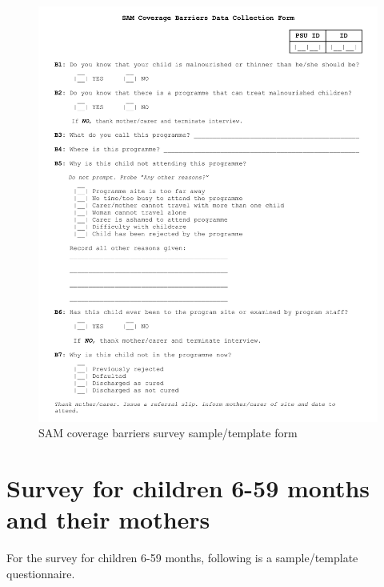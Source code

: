 \documentclass[12pt,a4paper]{book}
\theoremstyle{definition}
\theoremstyle{definition}
\theoremstyle{definition}
\theoremstyle{remark}
\begin{document}
\begin{figure}[H]

{\centering \includegraphics[width=0.9\linewidth]{forms/samBarriersForm} 

}

\caption{SAM coverage barriers survey sample/template form}\label{fig:sambarriers}
\end{figure}

\newpage

\hypertarget{survey-for-children-6-59-months-and-their-mothers}{%
\section{Survey for children 6-59 months and their
mothers}\label{survey-for-children-6-59-months-and-their-mothers}}

For the survey for children 6-59 months, following is a sample/template
questionnaire.
\end{document}

